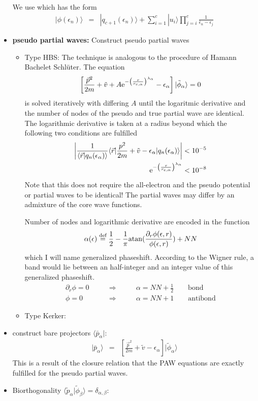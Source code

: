 \documentclass[11pt,a4paper]{report}
\begin{document}
\begin{itemize}
  We use  which has the form
  \begin{eqnarray*}
    |\phi(\epsilon_n)\rangle&=& |q_{c+1}(\epsilon_n)\rangle+\sum_{i=1}^{c}
    |u_i\rangle\prod_{j=i}^{c}\frac{1}{\bar{\epsilon}_n-\epsilon_j}
    \label{eq:fromqntophi}
  \end{eqnarray*}
%
\item \textbf{pseudo partial waves:} Construct pseudo partial waves
\begin{itemize}
\item Type HBS: The technique is analogous to the procedure of Hamann
  Bachelet Schl\"uter.
The equation 
\begin{eqnarray*}
\left[\frac{\vec{p}^2}{2m}+\tilde{v}
+ A\mathrm{e}^{-\left(\frac{r}{r_{c,\alpha}}\right)^{\lambda_\alpha}}-\epsilon_\alpha\right]
|\tilde\phi_\alpha\rangle=0
\end{eqnarray*}
is solved iteratively with differing $A$ until the logaritmic
derivative and the number of nodes of the pseudo and true partial wave
are identical. The logarithmic derivative is taken at a radius beyond
which the following two conditions are fulfilled
\begin{eqnarray*}
\left|\frac{1}{\langle\vec{r}|q_n(\epsilon_\alpha)\rangle}
\langle\vec{r}|
\frac{p^2}{2m}+\tilde{v}-\epsilon_\alpha|q_n(\epsilon_\alpha)\rangle\right|
<10^{-5}
\\
\mathrm{e}^{-\left(\frac{r}{r_{c,\alpha}}\right)^{\lambda_\alpha}}<10^{-8}
\end{eqnarray*}
Note that this does not require the all-electron and the pseudo
potential or partial waves to be identical! The partial waves may
differ by an admixture of the core wave functions.

Number of nodes and logarithmic derivative are encoded in the function
\begin{eqnarray*}
\alpha(\epsilon)\stackrel{\text{def}}{=}
\frac{1}{2}-\frac{1}{\pi}
{\rm atan}(\frac{\partial_r\phi(\epsilon,r)}{\phi(\epsilon,r)})+NN
\end{eqnarray*}
which I will name generalized phaseshift.  According to the Wigner
rule, a band would lie between an half-integer and an integer value of
this generalized phaseshift. 
\begin{eqnarray*}
\partial_r\phi=0&\qquad\Rightarrow\qquad&\alpha= NN+\frac{1}{2}\qquad\text{bond}
\\
\phi=0&\qquad\Rightarrow\qquad&\alpha=NN+1\qquad\text{antibond}
\end{eqnarray*}


\item Type Kerker:
\end{itemize}
\item construct bare projectors $\langle\bar{p}_\alpha|$:
\begin{eqnarray*}
|\bar{p}_\alpha\rangle
&=&\left[\frac{\vec{p}^2}{2m}+\tilde{v}-\epsilon_\alpha\right]
|\tilde{\phi}_\alpha\rangle
\end{eqnarray*}
This is a result of the closure relation that the PAW equations are
exactly fulfilled for the pseudo partial waves.
\item Biorthogonality
  $\langle\tilde{p}_\alpha|\tilde{\phi}_\beta\rangle=\delta_{\alpha,\beta}$:


\end{itemize}
\end{document}
